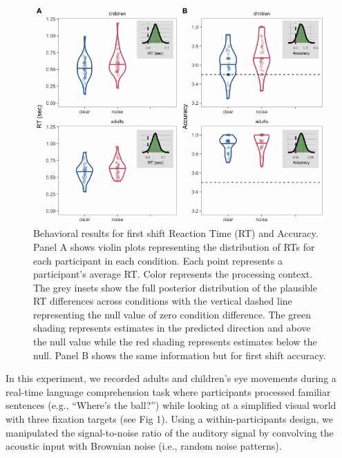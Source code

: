 \documentclass[10pt, letterpaper]{article}
\newenvironment{CodeChunk}{}{}
\begin{document}
\begin{CodeChunk}
\begin{figure}[t]

{\centering \includegraphics[width=0.9\linewidth]{figs/noise_acc_rt_e1_plot-1} 

}

\caption[Behavioral results for first shift Reaction Time (RT) and Accuracy]{Behavioral results for first shift Reaction Time (RT) and Accuracy. Panel A shows violin plots representing the distribution of RTs for each participant in each condition. Each point represents a participant's average RT. Color represents the processing context. The grey insets show the full posterior distribution of the plausible RT differences across conditions with the vertical dashed line representing the null value of zero condition difference. The green shading represents estimates in the predicted direction and above the null value while the red shading represents estimates below the null. Panel B shows the same information but for first shift accuracy.}\label{fig:noise_acc_rt_e1_plot}
\end{figure}
\end{CodeChunk}

In this experiment, we recorded adults and children's eye movements
during a real-time language comprehension task where participants
processed familiar sentences (e.g., ``Where's the ball?'') while looking
at a simplified visual world with three fixation targets (see Fig 1).
Using a within-participants design, we manipulated the signal-to-noise
ratio of the auditory signal by convolving the acoustic input with
Brownian noise (i.e., random noise patterns).
\end{document}
